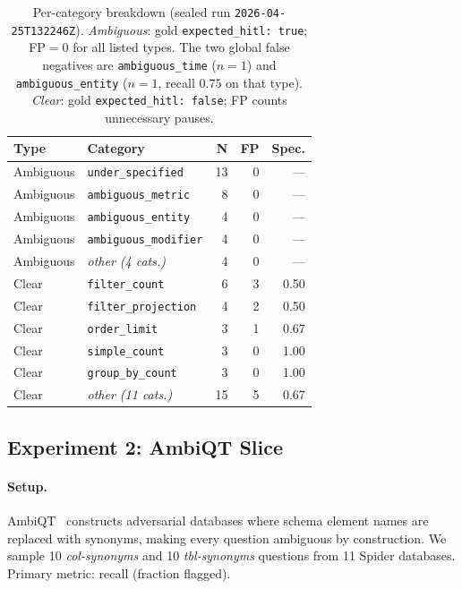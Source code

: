 \documentclass{article}
\begin{document}
\begin{table}[h]
\centering
\caption{Per-category breakdown (sealed run \texttt{2026-04-25T132246Z}).
  \emph{Ambiguous}: gold \texttt{expected\_hitl: true}; FP${=}0$ for all listed types.
  The two global false negatives are \texttt{ambiguous\_time} ($n{=}1$) and
  \texttt{ambiguous\_entity} ($n{=}1$, recall $0.75$ on that type).
  \emph{Clear}: gold \texttt{expected\_hitl: false}; FP counts unnecessary pauses.}
\label{tab:category}
\small
\begin{tabular}{llrrr}
\toprule
\textbf{Type} & \textbf{Category} & \textbf{N} & \textbf{FP} & \textbf{Spec.} \\
\midrule
\rowcolor{tpgreen}
Ambiguous & \texttt{under\_specified}    & 13 & 0 & — \\
\rowcolor{tpgreen}
Ambiguous & \texttt{ambiguous\_metric}   &  8 & 0 & — \\
\rowcolor{tpgreen}
Ambiguous & \texttt{ambiguous\_entity}   &  4 & 0 & — \\
\rowcolor{tpgreen}
Ambiguous & \texttt{ambiguous\_modifier} &  4 & 0 & — \\
\rowcolor{tpgreen}
Ambiguous & \textit{other (4 cats.)}     &  4 & 0 & — \\
\midrule
\rowcolor{fpred}
Clear & \texttt{filter\_count}        &  6 & 3 & 0.50 \\
\rowcolor{fpred}
Clear & \texttt{filter\_projection}   &  4 & 2 & 0.50 \\
\rowcolor{fpred}
Clear & \texttt{order\_limit}         &  3 & 1 & 0.67 \\
\rowcolor{fpred}
Clear & \texttt{simple\_count}        &  3 & 0 & 1.00 \\
\rowcolor{fpred}
Clear & \texttt{group\_by\_count}     &  3 & 0 & 1.00 \\
\rowcolor{fpred}
Clear & \textit{other (11 cats.)}     & 15 & 5 & 0.67 \\
\bottomrule
\end{tabular}
\end{table}

\subsection{Experiment 2: AmbiQT Slice}
\label{sec:exp2}

\paragraph{Setup.}
AmbiQT~\citep{ambiqt} constructs adversarial databases where schema element
names are replaced with synonyms, making every question ambiguous by
construction.
We sample 10 \emph{col-synonyms} and 10 \emph{tbl-synonyms} questions from
11 Spider databases.
Primary metric: recall (fraction flagged).
\end{document}
